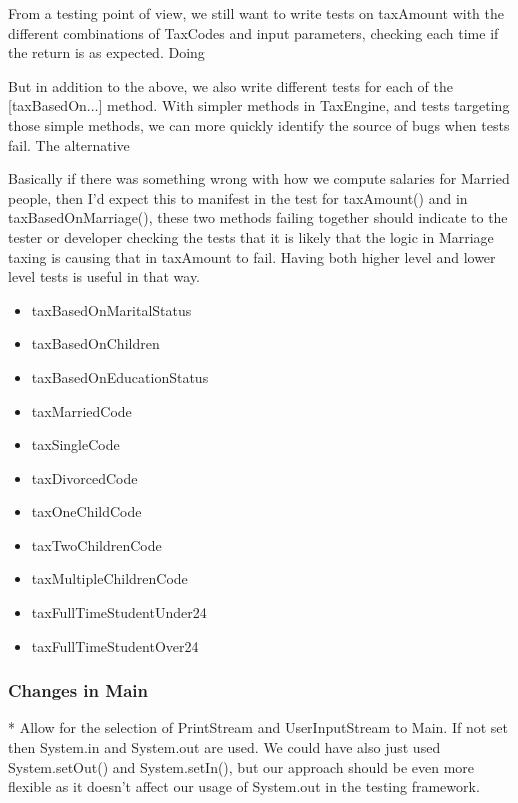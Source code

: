 From a testing point of view, we still want to write tests on taxAmount with the different combinations of TaxCodes and input parameters, checking each time if the return is as expected. Doing  

But in addition to the above, we also write different tests for each of the [taxBasedOn...] method. With simpler methods in TaxEngine, and tests targeting those simple methods, we can more quickly identify the source of bugs when tests fail. The alternative 

Basically if there was something wrong with how we compute salaries for Married people, then I'd expect this to manifest in the test for taxAmount() and
in taxBasedOnMarriage(), these two methods failing together should indicate to the tester or developer checking the tests that it is likely that the logic
in Marriage taxing is causing that in taxAmount to fail. Having both higher level and lower level tests is useful in that way. 

\begin{itemize}
\item taxBasedOnMaritalStatus
\item taxBasedOnChildren
\item taxBasedOnEducationStatus  
\item taxMarriedCode
\item taxSingleCode
\item taxDivorcedCode
\item taxOneChildCode
\item taxTwoChildrenCode
\item taxMultipleChildrenCode
\item taxFullTimeStudentUnder24
\item taxFullTimeStudentOver24
\end{itemize}

\subsubsection{Changes in Main}

* Allow for the selection of PrintStream and UserInputStream to Main. If not set then System.in and System.out are used. 
We could have also just used System.setOut() and System.setIn(), but our approach should be even more flexible as it doesn't affect our usage of System.out in the testing framework. 

